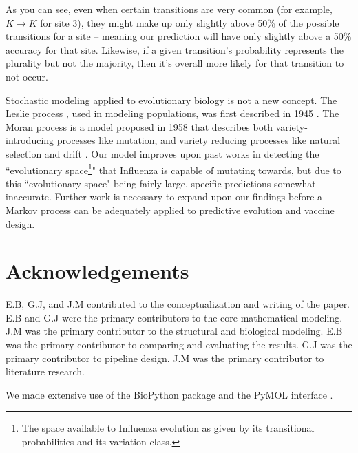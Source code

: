 \documentclass[12pt]{article}
\begin{document}
\begin{multicols}{2}
As you can see, even when certain transitions are very common (for example, $K \rightarrow K$ for site 3), they might make up only slightly above 50\% of the possible transitions for a site -- meaning our prediction will have only slightly above a 50\% accuracy for that site. Likewise, if a given transition's probability represents the plurality but not the majority, then it's overall more likely for that transition to not occur.  

Stochastic modeling applied to evolutionary biology is not a new  concept. The Leslie process , used in modeling populations, was first described in 1945 \citep{leslie1945use}. The Moran process is a model proposed in 1958 that describes both variety-introducing processes like mutation, and variety reducing processes like natural selection and drift \citep{traulsen2005coevolutionary}. Our model improves upon past works in detecting the ``evolutionary space\footnote{The space available to Influenza evolution as given by its transitional probabilities and its variation class.}" that Influenza is capable of mutating towards, but due to this ``evolutionary space" being fairly large, specific predictions somewhat inaccurate. Further work is necessary to expand upon our findings before a Markov process can be adequately applied to predictive evolution and vaccine design.

\section{Acknowledgements}
E.B, G.J, and J.M contributed to the conceptualization and writing of the paper.
E.B and G.J were the primary contributors to the core mathematical modeling. 
J.M was the primary contributor to the structural and biological modeling. E.B was the primary contributor to comparing and evaluating the results.  G.J was the primary contributor to pipeline design. J.M was the primary contributor to literature research.

We made extensive use of the BioPython package \citep{cock2009biopython} and the PyMOL interface \citep{delano2002pymol}.

\end{multicols}
\newpage



\end{document}
